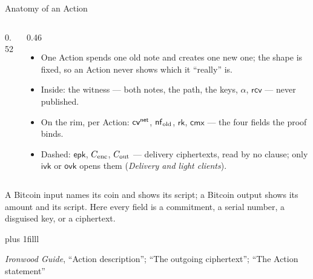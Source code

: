 \documentclass[aspectratio=169,11pt]{beamer}
\newcommand{\cmx}{\ensuremath{\mathsf{cmx}}}
\newcommand{\rksym}{\ensuremath{\mathsf{rk}}}
\newcommand{\ivk}{\ensuremath{\mathsf{ivk}}}
\newcommand{\ovk}{\ensuremath{\mathsf{ovk}}}
\newcommand{\rcv}{\ensuremath{\mathsf{rcv}}}
\newcommand{\epk}{\ensuremath{\mathsf{epk}}}
\newcommand{\src}[1]{\par\vskip0pt plus 1filll
  {\fontsize{6}{7.2}\selectfont\color{arbdim}\raggedright #1\par}}
\begin{document}
\begin{frame}{Anatomy of an Action}
\begin{columns}[T]
\begin{column}{0.52\textwidth}
\centering\ActionBox
\end{column}
\begin{column}{0.46\textwidth}
\begin{itemize}\small
  \item One Action spends one old note and creates one new one; the
    shape is fixed, so an Action never shows which it ``really'' is.
  \item Inside: the witness --- both notes, the path, the keys,
    $\alpha$, $\rcv$ --- never published.
  \item On the rim, per Action: $\mathsf{cv}^{\mathsf{net}}$, $\mathsf{nf}_{\mathrm{old}}$, $\rksym$, $\cmx$ ---
    the four fields the proof binds.
  \item Dashed: $\epk$, $C_{\mathrm{enc}}$, $C_{\mathrm{out}}$ --- delivery ciphertexts,
    read by no clause; only $\ivk$ or $\ovk$ opens them
    (\emph{Delivery and light clients}).
\end{itemize}
\end{column}
\end{columns}
\vspace{0pt}
\small A Bitcoin input names its coin and shows its script; a Bitcoin
output shows its amount and its script. Here every field is a
commitment, a serial number, a disguised key, or a ciphertext.
\src{\emph{Ironwood Guide}, ``Action description'';
``The outgoing ciphertext''; ``The Action statement''}
\end{frame}
\end{document}
